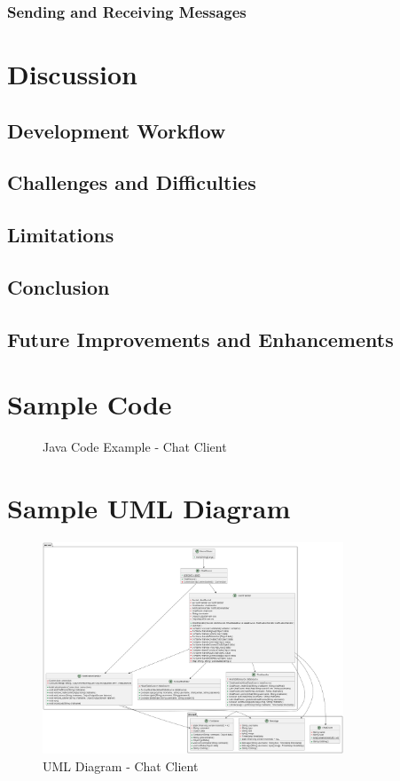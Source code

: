\documentclass[a4paper,11pt]{article}
\begin{document}
\subsubsection{Sending and Receiving Messages}

\section{Discussion}
\subsection{Development Workflow}
\subsection{Challenges and Difficulties}
\subsection{Limitations}
\subsection{Conclusion}
\subsection{Future Improvements and Enhancements}

\newpage
\section{Sample Code}

\begin{figure}[h]\centering\caption{Java Code Example - Chat Client}\end{figure}

\newpage
\section{Sample UML Diagram}
\begin{figure}[h]
    \centering
    \includegraphics[width=0.8\textwidth]{server.png} %
    \caption{UML Diagram - Chat Client}
\end{figure}

\newpage
{}
\setcounter{page}{5}
\renewcommand\refname{References}
\printbibliography
\end{document}
